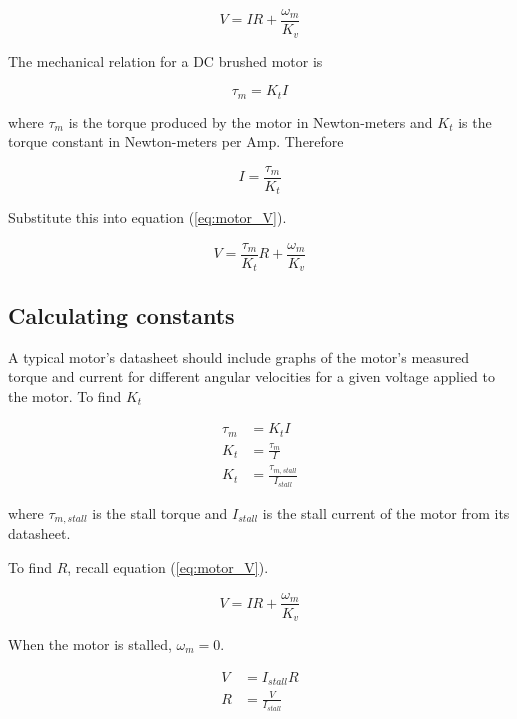 \begin{equation}
  V = IR + \frac{\omega_m}{K_v} \label{eq:motor_V}
\end{equation}

The mechanical relation for a DC brushed motor is

\begin{equation}
  \tau_m = K_t I \label{eq:motor_tau_m}
\end{equation}

where $\tau_m$ is the torque produced by the motor in Newton-meters and $K_t$ is
the torque constant in Newton-meters per Amp. Therefore

\begin{equation*}
  I = \frac{\tau_m}{K_t}
\end{equation*}

Substitute this into equation (\ref{eq:motor_V}).

\begin{equation}
  V = \frac{\tau_m}{K_t} R + \frac{\omega_m}{K_v} \label{eq:motor_tau_V}
\end{equation}

\subsection{Calculating constants}

A typical motor's datasheet should include graphs of the motor's measured torque
and current for different angular velocities for a given voltage applied to the
motor. To find $K_t$

\begin{align}
  \tau_m &= K_t I \nonumber \\
  K_t &= \frac{\tau_m}{I} \nonumber \\
  K_t &= \frac{\tau_{m,stall}}{I_{stall}}
\end{align}

where $\tau_{m,stall}$ is the stall torque and $I_{stall}$ is the stall current
of the motor from its datasheet.

To find $R$, recall equation (\ref{eq:motor_V}).

\begin{equation*}
  V = IR + \frac{\omega_m}{K_v}
\end{equation*}

When the motor is stalled, $\omega_m = 0$.

\begin{align}
  V &= I_{stall} R \nonumber \\
  R &= \frac{V}{I_{stall}}
\end{align}

